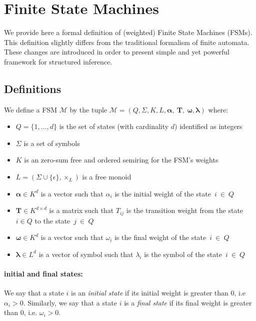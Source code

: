 \section{Finite State Machines}

We provide here a formal definition of (weighted) Finite State Machines
(FSMs). This definition slightly differs from the traditional formalism
of finite automata. These changes are introduced in order to present
simple and yet powerful framework for structured inference.

\subsection{Definitions}

We define a FSM $\mathcal{M}$ by the tuple
$\mathcal{M} = (Q, \Sigma, K, L, \boldsymbol{\alpha},~\mathbf{T},~\boldsymbol{\omega}, \boldsymbol{\lambda})$
where:
\begin{itemize}
    \item $Q = \{1, \dots, d\}$ is the set of states (with cardinality $d$)
        identified as integers
    \item $\Sigma$ is a set of symbols
    \item $K$ is an zero-sum free and ordered semiring for the FSM's weights
    \item $L = (\Sigma \cup \{ \epsilon \}, \times_L)$ is a free monoid
    \item $\boldsymbol{\alpha} \in K^d$ is a vector such that $\alpha_i$
    is the initial weight of the state~$i~\in~Q$
    \item $\mathbf{T} \in K^{d\times d}$ is a matrix such that $T_{ij}$
        is the transition weight from the state $i \in Q$ to the state~$j~\in~Q$
    \item $\boldsymbol{\omega} \in K^d$ is a vector such that $\omega_i$
        is the final weight of the state~$i~\in~Q$
    \item $\boldsymbol{\lambda} \in L^d$ is a vector of symbol such that
        $\lambda_i$ is the symbol of the state~$i~\in~Q$
\end{itemize}

\paragraph{initial and final states:} We say that a state $i$ is an
\emph{initial state} if its initial weight is greater than $0$,
i.e $\alpha_i > 0$. Similarly, we say that a state $i$ is a
\emph{final state} if its final weight is greater than $0$, i.e.
$\omega_i > 0$.

